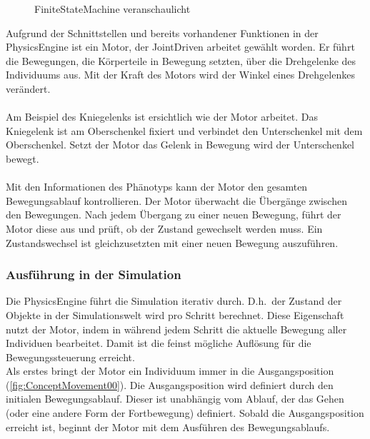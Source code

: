       \begin{figure}[H]
        \centering
        
        \caption{\Gls{FiniteStateMachine} veranschaulicht\label{fig:ConceptEngineFSM}}
      \end{figure}

      Aufgrund der Schnittstellen und bereits vorhandener Funktionen in der \gls{PhysicsEngine} ist ein Motor,
      der \gls{JointDriven} arbeitet gewählt worden.
      Er führt die Bewegungen, die Körperteile in Bewegung setzten, über die Drehgelenke des Individuums aus.
      Mit der Kraft des Motors wird der Winkel eines Drehgelenkes verändert.
      \\
      \\
      Am Beispiel des Kniegelenks ist ersichtlich wie der Motor arbeitet.
      Das Kniegelenk ist am Oberschenkel fixiert und verbindet den Unterschenkel mit dem Oberschenkel.
      Setzt der Motor das Gelenk in Bewegung wird der Unterschenkel bewegt.
      \\
      \\
      Mit den Informationen des Phänotyps kann der Motor den gesamten Bewegungsablauf kontrollieren.
      Der Motor überwacht die Übergänge zwischen den Bewegungen.
      Nach jedem Übergang zu einer neuen Bewegung, führt der Motor diese aus und prüft,
      ob der Zustand gewechselt werden muss.
      Ein Zustandswechsel ist gleichzusetzten mit einer neuen Bewegung auszuführen.

      \subsubsection{Ausführung in der Simulation}

      Die \gls{PhysicsEngine} führt die Simulation iterativ durch.
      D.h.\ der Zustand der Objekte in der Simulationswelt wird pro Schritt berechnet.
      Diese Eigenschaft nutzt der Motor,
      indem in während jedem Schritt die aktuelle Bewegung aller Individuen bearbeitet.
      Damit ist die feinst mögliche Auflösung für die Bewegungssteuerung erreicht.
      \\
      Als erstes bringt der Motor ein Individuum immer in die Ausgangsposition (\vref{fig:ConceptMovement00}).
      Die Ausgangsposition wird definiert durch den initialen Bewegungsablauf.
      Dieser ist unabhängig vom Ablauf, der das Gehen (oder eine andere Form der Fortbewegung) definiert.
      Sobald die Ausgangsposition erreicht ist, beginnt der Motor mit dem Ausführen des Bewegungsablaufs.

